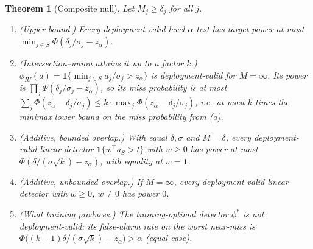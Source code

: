 \documentclass[11pt]{article}
\newtheorem{theorem}{Theorem}[section]
\theoremstyle{definition}
\theoremstyle{remark}
\newcommand{\1}{\mathbf{1}}
\begin{document}
\begin{theorem}[Composite null]\label{thm:composite}
Let $M_j\ge\delta_j$ for all $j$.
\begin{enumerate}[label=(\alph*)]
\item \emph{(Upper bound.)} Every deployment-valid level-$\alpha$ test has target power at most $\min_{j\in S}\Phi(\delta_j/\sigma_j-z_\alpha)$.
\item \emph{(Intersection--union attains it up to a factor $k$.)} $\phi_{IU}(a)=\1\{\min_{j\in S}a_j/\sigma_j>z_\alpha\}$ is deployment-valid for $M=\infty$. Its power is $\prod_{j}\Phi(\delta_j/\sigma_j-z_\alpha)$, so its miss probability is at most $\sum_j\Phi(z_\alpha-\delta_j/\sigma_j)\le k\cdot\max_j\Phi(z_\alpha-\delta_j/\sigma_j)$, i.e.\ at most $k$ times the minimax lower bound on the miss probability from (a).
\item \emph{(Additive, bounded overlap.)} With equal $\delta,\sigma$ and $M=\delta$, every deployment-valid linear detector $\1\{w^\top a_S>t\}$ with $w\ge0$ has power at most $\Phi(\delta/(\sigma\sqrt k)-z_\alpha)$, with equality at $w=\1$.
\item \emph{(Additive, unbounded overlap.)} If $M=\infty$, every deployment-valid linear detector with $w\ge0$, $w\ne0$ has power $0$.
\item \emph{(What training produces.)} The training-optimal detector $\phi^*$ is not deployment-valid: its false-alarm rate on the worst near-miss is $\Phi\big((k-1)\delta/(\sigma\sqrt k)-z_\alpha\big)>\alpha$ (equal case).
\end{enumerate}
\end{theorem}
\end{document}
